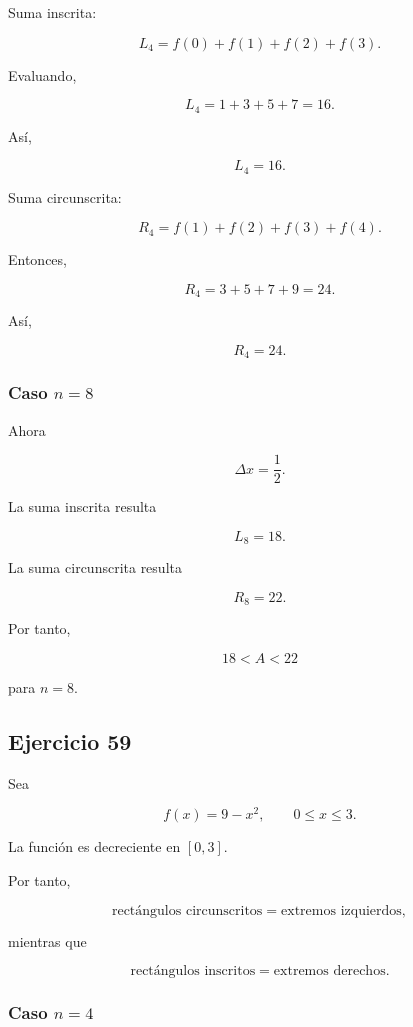 \documentclass[12pt]{article}
\begin{document}
Suma inscrita:

\[
L_4
=
f(0)+f(1)+f(2)+f(3).
\]

Evaluando,

\[
L_4
=
1+3+5+7
=
16.
\]

Así,

\[
\boxed{L_4=16}.
\]

Suma circunscrita:

\[
R_4
=
f(1)+f(2)+f(3)+f(4).
\]

Entonces,

\[
R_4
=
3+5+7+9
=
24.
\]

Así,

\[
\boxed{R_4=24}.
\]

\subsubsection*{Caso \(n=8\)}

Ahora

\[
\Delta x
=
\frac12.
\]

La suma inscrita resulta

\[
\boxed{
L_8=18
}.
\]

La suma circunscrita resulta

\[
\boxed{
R_8=22
}.
\]

Por tanto,

\[
\boxed{
18<A<22
}
\]

para \(n=8\).

\subsection*{Ejercicio 59}

Sea

\[
f(x)=9-x^2,
\qquad
0\leq x\leq3.
\]

La función es decreciente en \([0,3]\).

Por tanto,

\[
\text{rectángulos circunscritos}
=
\text{extremos izquierdos},
\]

mientras que

\[
\text{rectángulos inscritos}
=
\text{extremos derechos}.
\]

\subsubsection*{Caso \(n=4\)}
\end{document}
